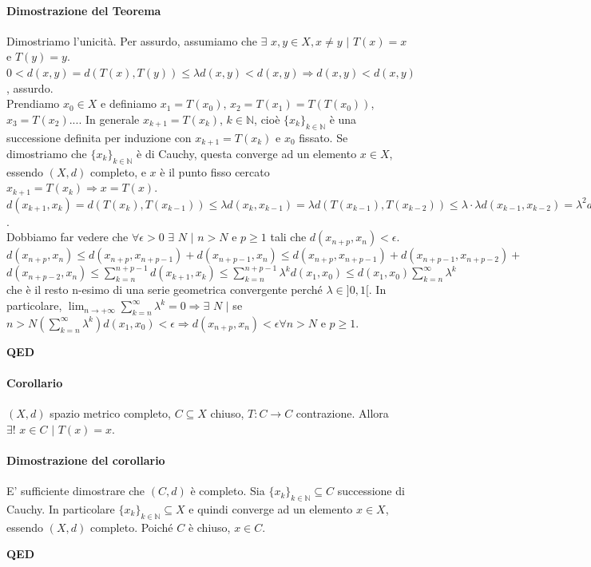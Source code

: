 \documentclass{article}
\newcommand{\N}{\mathbb{N}}
\begin{document}
\paragraph{Dimostrazione del Teorema}
Dimostriamo l'unicità. Per assurdo, assumiamo che $\exists \,\, x,y\in X, x \neq y \,\, | \,\, T(x)=x$ e $T(y)=y$. $0 < d(x,y)=d(T(x),T(y))\leq \lambda d(x,y) < d(x,y) \Rightarrow d(x,y) < d(x,y)$, assurdo.\\
Prendiamo $x_0 \in X$ e definiamo $x_1 = T(x_0)$, $x_2 = T(x_1)= T(T(x_0))$, $x_3 = T(x_2)$....
In generale $x_{k+1}=T(x_k)$, $k \in \N$, cioè $\{x_k\}_{k \in \N}$ è una successione definita per induzione con $x_{k+1}=T(x_k)$ e $x_0$ fissato. Se dimostriamo che $\{x_k\}_{k \in \N}$ è di Cauchy, questa converge ad un elemento $x \in X$, essendo $(X,d)$ completo, e $x$ è il punto fisso cercato $x_{k+1}=T(x_k) \Rightarrow x = T(x)$.\\
$d(x_{k+1},x_k)=d(T(x_k),T(x_{k-1}))\leq \lambda d(x_k,x_{k-1}) = \lambda d(T(x_{k-1}),T(x_{k-2}))\leq \lambda \cdot \lambda d(x_{k-1},x_{k-2})=\lambda^2d(x_{k-1},x_{k-2}) \leq \lambda^3 d() \leq...\leq \lambda^k d(x_1,x_0)$.\\
Dobbiamo far vedere che $\forall \epsilon >0 \,\, \exists \,\, N \,\, | \,\, n >N$ e $p \geq 1$ tali che $d(x_{n+p},x_n)< \epsilon$.\\
$d(x_{n+p},x_n) \leq d(x_{n+p},x_{n+p-1})+d(x_{n+p-1},x_n)\leq d(x_{n+p},x_{n+p-1})+d(x_{n+p-1},x_{n+p-2})+$$d(x_{n+p-2},x_n)\leq \sum_{k=n}^{n+p-1} d(x_{k+1},x_k)\leq \sum_{k=n}^{n+p-1} \lambda^k d(x_{1},x_0)\leq d(x_1,x_0)\sum_{k=n}^{\infty} \lambda^k$ che è il resto n-esimo di una serie geometrica convergente perché $\lambda \in ]0,1[$. In particolare, $\lim_{n\rightarrow +\infty} \sum_{k=n}^{\infty}\lambda^k=0 \Rightarrow \exists\,\, N \,\, |$ se $n> N\left(\sum_{k=n}^{\infty}\lambda^k\right)d(x_1,x_0)<\epsilon \Rightarrow d(x_{n+p},x_n)<\epsilon \forall n > N$ e $p \geq 1$.
\begin{flushright}
\textbf{QED}
\end{flushright}

\paragraph{Corollario}
$(X,d)$ spazio metrico completo, $C\subseteq X$ chiuso, $T: C \rightarrow C$ contrazione. Allora $\exists!\,\, x \in C \,\, | \,\, T(x)=x$.

\paragraph{Dimostrazione del corollario}
E' sufficiente dimostrare che $(C,d)$ è completo. Sia $\{x_k\}_{k \in \N}\subseteq C$ successione di Cauchy. In particolare $\{x_k\}_{k \in \N} \subseteq X $ e quindi converge ad un elemento $x \in X$, essendo $(X,d)$ completo. Poiché $C$ è chiuso, $x \in C$.
\begin{flushright}
\textbf{QED}
\end{flushright}
\end{document}
